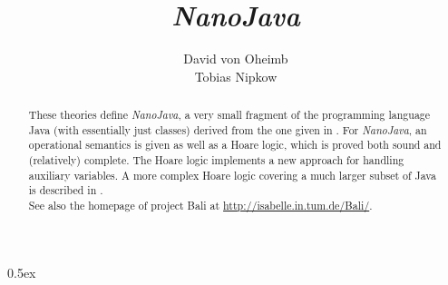 \documentclass[11pt,a4paper]{article}
\newcommand{\nJava}{\it NanoJava}
\begin{document}
\title{\nJava}
\author{David von Oheimb \\ Tobias Nipkow}
\maketitle

\begin{abstract}\noindent
  These theories define {\nJava}, a very small fragment of the programming 
  language Java (with essentially just classes) derived from the one given 
  in \cite{NipkowOP00}.
  For {\nJava}, an operational semantics is given as well as a Hoare logic,
  which is proved both sound and (relatively) complete. The Hoare logic
  implements a new approach for handling auxiliary variables.
  A more complex Hoare logic covering a much larger subset of Java is described
  in \cite{DvO-CPE01}.\\
See also the homepage of project Bali at \url{http://isabelle.in.tum.de/Bali/}.
\end{abstract}

\tableofcontents
\parindent 0pt \parskip 0.5ex

\newpage


\newpage
\nocite{*}


\end{document}
